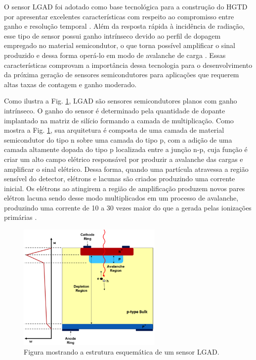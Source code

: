 O sensor LGAD foi adotado como base tecnológica para a construção do HGTD por apresentar excelentes características com respeito ao compromisso entre ganho e resolução temporal \cite{tdr,JIN_LGAD,NIMA_LGAD,NIMA_LGAD_I,NIMA_LGAD_II,NIMA_LGAD_III}. Além da resposta rápida à incidência de radiação, esse tipo de sensor possui ganho intrínseco devido ao perfil de dopagem empregado no material semicondutor, o que torna possível amplificar o sinal produzido e dessa forma operá-lo em modo de avalanche de carga \cite{JIN_LGAD,NIMA_LGAD,NIMA_LGAD_I,NIMA_LGAD_II,NIMA_LGAD_III}. Essas características comprovam a importância dessa tecnologia para o desenvolvimento da próxima geração de sensores semicondutores para aplicações que requerem altas taxas de contagem e ganho moderado.
\thispagestyle{plain}

Como ilustra a Fig. \ref{lgad}, LGAD são sensores semicondutores planos com ganho intrínseco. O ganho do sensor é determinado pela quantidade de dopante implantado na matriz de silício formando a camada de multiplicação. Como mostra a Fig. \ref{lgad}, sua arquitetura é composta de uma camada de material semicondutor do tipo n sobre uma camada do tipo p, com a adição de uma camada altamente dopada do tipo p localizada entre a junção n-p, cuja função é criar um alto campo elétrico responsável por produzir a avalanche das cargas e amplificar o sinal elétrico. Dessa forma, quando uma partícula atravessa a região sensível do detector, elétrons e lacunas são criados produzindo uma corrente inicial. Os elétrons ao atingirem a região de amplificação produzem novos pares elétron lacuna sendo desse modo multiplicados em um processo de avalanche, produzindo uma corrente de 10 a 30 vezes maior do que a gerada pelas ionizações primárias \cite{JIN_LGAD,NIMA_LGAD_III}. 

\begin{figure}
    \centering
    \includegraphics[width=7.0cm]{assets/lgad.png}
    \caption{Figura mostrando a estrutura esquemática de um sensor LGAD.}
    \label{lgad}
\end{figure}
\thispagestyle{plain}

